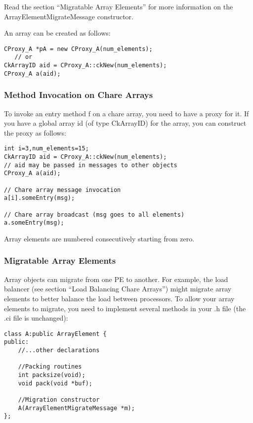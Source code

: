 Read the section ``Migratable Array Elements'' for more
information on the ArrayElementMigrateMessage
constructor. 


An array can be created as follows:

\begin{verbatim}
CProxy_A *pA = new CProxy_A(num_elements);
   // or
CkArrayID aid = CProxy_A::ckNew(num_elements);
CProxy_A a(aid);
\end{verbatim}


\subsubsection{Method Invocation on Chare Arrays}

To invoke an entry method f on a chare array, you need to have a proxy
for it.  If you have a global array id (of type CkArrayID) for the
array, you can construct the proxy as follows:

\begin{verbatim}
int i=3,num_elements=15;
CkArrayID aid = CProxy_A::ckNew(num_elements);
// aid may be passed in messages to other objects
CProxy_A a(aid);

// Chare array message invocation
a[i].someEntry(msg);

// Chare array broadcast (msg goes to all elements)
a.someEntry(msg);
\end{verbatim}

Array elements are numbered consecutively starting from zero.



\subsubsection{Migratable Array Elements}
Array objects can migrate from one PE to another.
For example, the load balancer (see section ``Load Balancing Chare Arrays'')
might migrate array elements to better balance the load between
processors.  To allow your array elements to migrate, you need
to implement several methods in your .h file (the .ci file is 
unchanged):

\begin{verbatim}
class A:public ArrayElement {
public:
    //...other declarations

    //Packing routines
    int packsize(void);
    void pack(void *buf);

    //Migration constructor
    A(ArrayElementMigrateMessage *m);
};
\end{verbatim}

